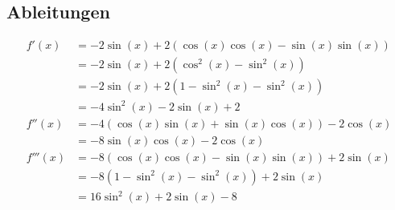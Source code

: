 \subsection{Ableitungen}
  \begin{align*}
    f'(x)&=-2\sin(x)+2(\cos(x)\cos(x)-\sin(x)\sin(x))\\
    &=-2\sin(x)+2(\cos^2(x)-\sin^2(x))\\
    &=-2\sin(x)+2(1-\sin^2(x)-\sin^2(x))\\
    &=-4\sin^2(x)-2\sin(x)+2\\
    f''(x)&=-4(\cos(x)\sin(x)+\sin(x)\cos(x))-2\cos(x)\\
    &=-8\sin(x)\cos(x)-2\cos(x)\\
    f'''(x)&=-8(\cos(x)\cos(x)-\sin(x)\sin(x))+2\sin(x)\\
    &=-8(1-\sin^2(x)-\sin^2(x))+2\sin(x)\\
    &=16\sin^2(x)+2\sin(x)-8
  \end{align*}
